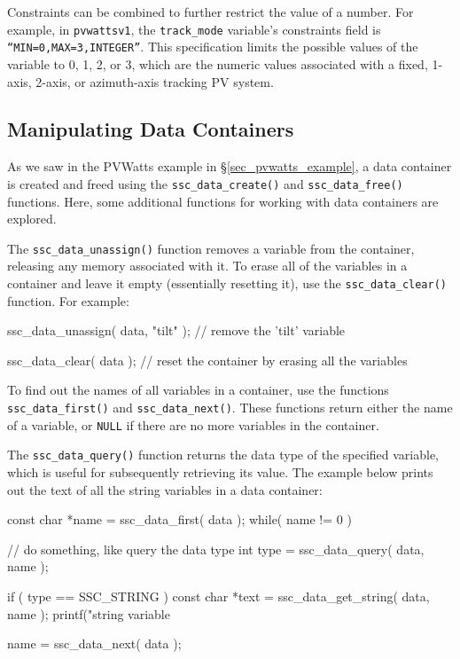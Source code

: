 \documentclass{scrartcl} %
\newcommand{\+}{\discretionary{\mbox{\scriptsize$\hookleftarrow$}}{}{}}
\begin{document}
Constraints can be combined to further restrict the value of a number.  For example, in \texttt{pvwattsv1}, the \texttt{track\_mode} variable's constraints field is \texttt{``MIN=0,MAX=3,INTEGER''}.  This specification limits the possible values of the variable to 0, 1, 2, or 3, which are the numeric values associated with a fixed, 1-axis, 2-axis, or azimuth-axis tracking PV system.

\subsection{Manipulating Data Containers}
\label{sec_data_manip}

As we saw in the PVWatts example in \S\ref{sec_pvwatts_example}, a data container is created and freed using the \texttt{ssc\_data\_create()} and \texttt{ssc\_data\_free()} functions.  Here, some additional functions for working with data containers are explored.

The \texttt{ssc\_data\_unassign()} function removes a variable from the container, releasing any memory associated with it.  To erase all of the variables in a container and leave it empty (essentially resetting it), use the \texttt{ssc\_data\_clear()} function.  For example:

\begin{verbatimtab}
ssc_data_unassign( data, "tilt" ); // remove the 'tilt' variable

ssc_data_clear( data ); // reset the container by erasing all the variables
\end{verbatimtab}

To find out the names of all variables in a container, use the functions \texttt{ssc\_data\_first()} and \texttt{ssc\_data\_next()}.  These functions return either the name of a variable, or \texttt{NULL} if there are no more variables in the container. 

The \texttt{ssc\_data\_query()} function returns the data type of the specified variable, which is useful for subsequently retrieving its value.  The example below prints out the text of all the string variables in a data container:

\begin{verbatimtab}[4]
const char *name = ssc_data_first( data );
while( name != 0 )
{
	// do something, like query the data type
	int type = ssc_data_query( data, name );

	if ( type == SSC_STRING )
	{
		const char *text = ssc_data_get_string( data, name );
		printf("string variable %
	}

	name = ssc_data_next( data );
}
\end{verbatimtab}
\end{document}
